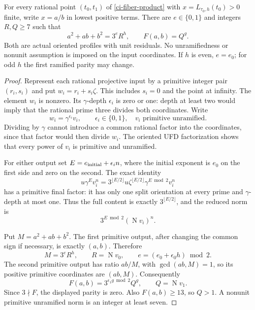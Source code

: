 \begin{theorem}
\label{ci-pure-inverse}
For every rational point $(t_0,t_1)$ of \eqref{ci-fiber-product}
with $x=L_{\tau_0,h}(t_0)>0$ finite, write $x=a/b$ in lowest
positive terms. There are $e\in\{0,1\}$ and integers $R,Q\ge7$
such that
\begin{equation}\label{ci-pure-norms}
 a^2+ab+b^2=3^eR^h,\qquad F(a,b)=Q^g.
\end{equation}
Both are actual oriented profiles with unit residuals. No
unramifiedness or nonunit assumption is imposed on the input
coordinates. If $h$ is even, $e=e_0$; for odd $h$ the first
ramified parity may change.
\end{theorem}
\begin{proof}
Represent each rational projective input by a primitive integer
pair $(r_i,s_i)$ and put $w_i=r_i+s_i\zeta$. This includes
$s_i=0$ and the point at infinity. The element $w_i$ is nonzero.
Its $\gamma$-depth $\epsilon_i$ is zero or one: depth at least
two would imply that the rational prime three divides both
coordinates. Write
\[
 w_i=\gamma^{\epsilon_i}v_i,\qquad
 \epsilon_i\in\{0,1\},\quad v_i\text{ primitive unramified}.
\]
Dividing by $\gamma$ cannot introduce a common rational factor
into the coordinates, since that factor would then divide $w_i$.
The oriented UFD factorization shows that every power of $v_i$
is primitive and unramified.

For either output set $E=e_{\rm initial}+\epsilon_i n$, where
the initial exponent is $e_0$ on the first side and zero on the
second. The exact identity
\begin{equation}\label{ci-gamma-content}
 u\gamma^Ev_i^n
 =3^{\lfloor E/2\rfloor}u\zeta^{\lfloor E/2\rfloor}
                  \gamma^{E\bmod2}v_i^n
\end{equation}
has a primitive final factor: it has only one split orientation
at every prime and $\gamma$-depth at most one. Thus the full
content is exactly $3^{\lfloor E/2\rfloor}$, and the reduced norm is
\begin{equation}\label{ci-reduced-norm}
 3^{E\bmod2}(\operatorname N v_i)^n.
\end{equation}

Put $M=a^2+ab+b^2$. The first primitive output, after changing
the common sign if necessary, is exactly $(a,b)$. Therefore
\[
 M=3^eR^h,\qquad R=\operatorname N v_0,
 \qquad e=(e_0+\epsilon_0h)\bmod2.
\]
The second primitive output has ratio $ab/M$, with
$\gcd(ab,M)=1$, so its positive primitive coordinates are
$(ab,M)$. Consequently
\[
 F(a,b)=3^{\epsilon_1g\bmod2}Q^g,
 \qquad Q=\operatorname N v_1.
\]
Since $3\nmid F$, the displayed parity is zero. Also
$F(a,b)\ge13$, so $Q>1$. A nonunit primitive unramified
norm is an integer at least seven.


\end{proof}
